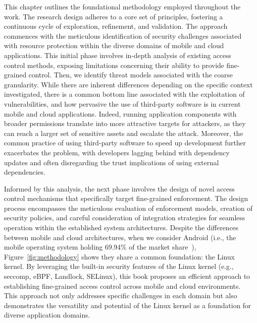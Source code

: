 This chapter outlines the foundational methodology employed throughout
the work. The research design adheres to a core set of principles,
fostering a continuous cycle of exploration, refinement, and
validation. The approach commences with the meticulous identification
of security challenges associated with resource protection within the
diverse domains of mobile and cloud applications. This initial phase
involves in-depth analysis of existing access control methods,
exposing limitations concerning their ability to provide fine-grained
control. Then, we identify threat models associated with the coarse
granularity. While there are inherent differences depending on the
specific context investigated, there is a common bottom line associated
with the exploitation of vulnerabilities, and how pervasive the use of
third-party software is in current mobile and cloud applications.
Indeed, running application components with broader permissions
translate into more attractive targets for attackers, as they can
reach a larger set of sensitive assets and escalate the attack.
Moreover, the common practice of using third-party software to speed
up development further exacerbates the problem, with developers
lagging behind with dependency updates and often disregarding the
trust implications of using external dependencies. %

Informed by this analysis, the next phase involves the design of novel
access control mechanisms that specifically target fine-grained
enforcement. The design process encompasses the meticulous evaluation
of enforcement models, creation of security policies, and careful
consideration of integration strategies for seamless operation within
the established system architectures. Despite the differences between
mobile and cloud architectures, when we consider Android (i.e., the
mobile operating system holding 69.94\% of the market
share~\cite{android-os-marker-share}), Figure~\ref{fig:methodology}
shows they share a common foundation: the Linux kernel. By leveraging
the built-in security features of the Linux kernel (e.g., seccomp,
eBPF, Landlock, SELinux), this book proposes an efficient approach
to establishing fine-grained access control across mobile and cloud
environments. This approach not only addresses specific challenges in
each domain but also demonstrates the versatility and potential of the
Linux kernel as a foundation for diverse application domains.

